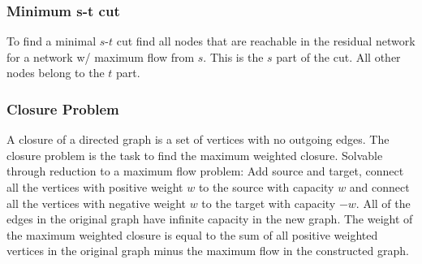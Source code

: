 \subsubsection{Minimum s-t cut}

To find a minimal $s$-$t$ cut find all nodes that are reachable in the
residual network for a network w/ maximum flow from $s$.  This is the
$s$ part of the cut.  All other nodes belong to the $t$ part.

\subsubsection{Closure Problem}

A closure of a directed graph is a set of vertices with no outgoing
edges.  The closure problem is the task to find the maximum weighted
closure.  Solvable through reduction to a maximum flow problem: Add
source and target, connect all the vertices with positive weight $w$
to the source with capacity $w$ and connect all the vertices with
negative weight $w$ to the target with capacity $-w$.  All of the
edges in the original graph have infinite capacity in the new
graph.  The weight of the maximum weighted closure is equal to the sum
of all positive weighted vertices in the original graph minus the
maximum flow in the constructed graph.

